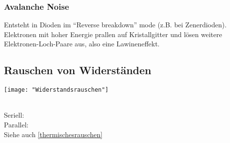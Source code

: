 \subsubsection{Avalanche Noise}
Entsteht in Dioden im “Reverse breakdown” mode (z.B. bei Zenerdioden).
Elektronen mit hoher Energie prallen auf Kristallgitter und lösen weitere Elektronen-Loch-Paare aus, also eine Lawineneffekt.



\subsection{Rauschen von Widerständen} \label{rauschenvonwiderständen}

\begin{minipage}[t]{0.3\textwidth}
	\vspace{0pt}
	\texttt{[image: "Widerstandsrauschen"]}
\end{minipage}\hspace{0.05\textwidth}
\begin{minipage}[t]{0.3\textwidth}
	\vspace{0pt}
	\\
	
	Seriell: \\
	Parallel: \\
	
	Siehe auch \ref{thermischesrauschen}
\end{minipage}\hspace{0.05\textwidth}
\begin{minipage}[t]{0.3\textwidth}
	\\
	\\
	\\
	\\
	\\
	\\
	\\
	\\
	\\
\end{minipage}
\vspace{2mm}

